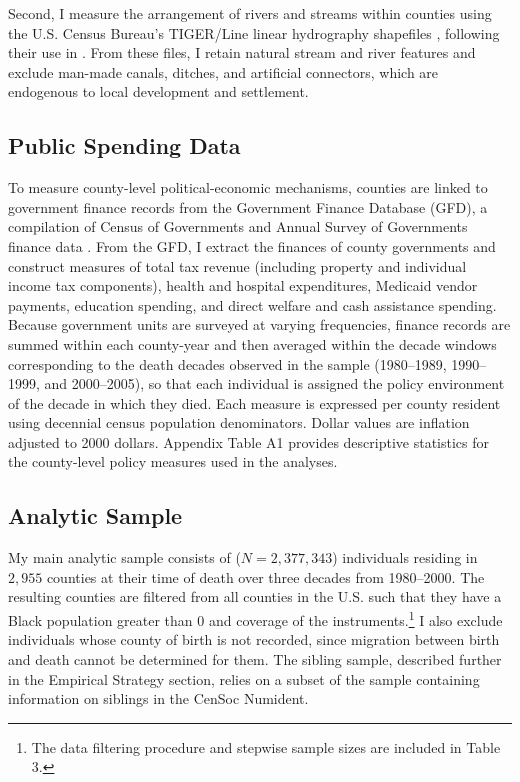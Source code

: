 \documentclass[11pt]{article}
\begin{document}
Second, I measure the arrangement of rivers and streams within counties using the U.S. Census Bureau's TIGER/Line linear hydrography shapefiles \citep{census_tiger_2023}, following their use in \citet{trounstine_segregation_2016}. From these files, I retain natural stream and river features and exclude man-made canals, ditches, and artificial connectors, which are endogenous to local development and settlement.

\subsection{Public Spending Data}

To measure county-level political-economic mechanisms, counties are linked to government finance records from the Government Finance Database (GFD), a compilation of Census of Governments and Annual Survey of Governments finance data \citep{pierson_government_2015}.
From the GFD, I extract the finances of county governments and construct measures of total tax revenue (including property and individual income tax components), health and hospital expenditures, Medicaid vendor payments, education spending, and direct welfare and cash assistance spending. Because government units are surveyed at varying frequencies, finance records are summed within each county-year and then averaged within the decade windows corresponding to the death decades observed in the sample (1980--1989, 1990--1999, and 2000--2005), so that each individual is assigned the policy environment of the decade in which they died. Each measure is expressed per county resident using decennial census population denominators. Dollar values are inflation adjusted to 2000 dollars. Appendix Table A1 provides descriptive statistics for the county-level policy measures used in the analyses.

\subsection{Analytic Sample}

My main analytic sample consists of ($N = 2{,}377{,}343$) individuals residing in $2{,}955$ counties at their time of death over three decades from 1980--2000. The resulting counties are filtered from all counties in the U.S. such that they have a Black population greater than 0 and coverage of the instruments.\footnote{The data filtering procedure and stepwise sample sizes are included in Table 3.} I also exclude individuals whose county of birth is not recorded, since migration between birth and death cannot be determined for them. The sibling sample, described further in the Empirical Strategy section, relies on a subset of the sample containing information on siblings in the CenSoc Numident.
\end{document}
